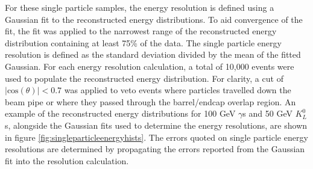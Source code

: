 For these single particle samples, the energy resolution is defined using a Gaussian fit to the reconstructed energy distributions.  To aid convergence of the fit, the fit was applied to the narrowest range of the reconstructed energy distribution containing at least 75\% of the data.  The single particle energy resolution is defined as the standard deviation divided by the mean of the fitted Gaussian.  For each energy resolution calculation, a total of 10,000 events were used to populate the reconstructed energy distribution.  For clarity, a cut of $|\text{cos}(\theta)| < 0.7$ was applied to veto events where particles travelled down the beam pipe or where they passed through the barrel/endcap overlap region.  An example of the reconstructed energy distributions for 100 GeV $\gamma$s and 50 GeV $K^{0}_{L}$s, alongside the Gaussian fits used to determine the energy resolutions, are shown in figure \ref{fig:singleparticleenergyhists}.  The errors quoted on single particle energy resolutions are determined by propagating the errors reported from the Gaussian fit into the resolution calculation.  


